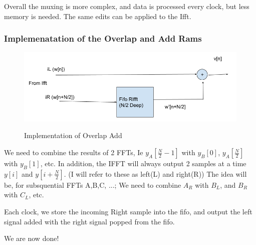 \documentclass{article}
\begin{document}
Overall the muxing is more complex, and data is processed every clock, but less memory is needed.
The same edits can be applied to the Ifft.

\pagebreak

\subsubsection{Implemenatation of the Overlap and Add Rams}

  \begin{figure}[h!]
    \centering
    \includegraphics[width=0.8\linewidth]{overlapadd_rams.png}
    \label{fig:overlap_add_rams}
    \caption{Implementation of Overlap Add}
  \end {figure}


We need to combine the results of 2 FFTs, Ie $y_{A}\left[\frac{N}{2}-1\right]$ with $y_{B}\left[0\right]$, 
$y_{A}\left[\frac{N}{2}\right]$ with $y_{B}\left[1\right]$, etc.
In addition, the IFFT will always output 2 samples at a time $y\left[i\right]$ and $y\left[i+\frac{N}{2}\right]$. (I will refer to these as left(L) and right(R))
The idea will be, for subsquential FFTs A,B,C, ...; We need to combine $A_{R}$ with $B_{L}$, and $B_{R}$ with $C_{L}$, etc.

Each clock, we store the incoming Right sample into the fifo, and output the left signal added with the right signal popped from the fifo.

We are now done!
\end{document}
